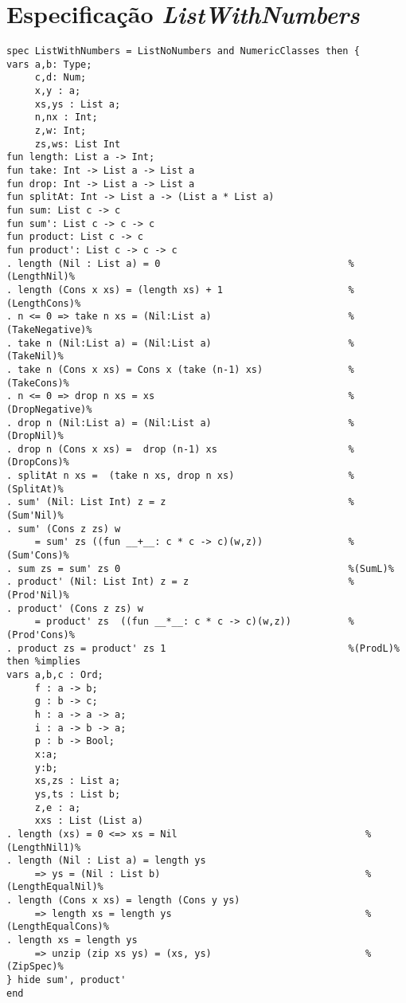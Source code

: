 \section{Especificação \textit{ListWithNumbers}}
\label{appendix:strictSpec:listWithNumbers}
\begin{Verbatim}
spec ListWithNumbers = ListNoNumbers and NumericClasses then {
vars a,b: Type;
     c,d: Num;
     x,y : a;
     xs,ys : List a;
     n,nx : Int;
     z,w: Int;
     zs,ws: List Int
fun length: List a -> Int;
fun take: Int -> List a -> List a
fun drop: Int -> List a -> List a
fun splitAt: Int -> List a -> (List a * List a)
fun sum: List c -> c
fun sum': List c -> c -> c
fun product: List c -> c
fun product': List c -> c -> c
. length (Nil : List a) = 0                                 %(LengthNil)%
. length (Cons x xs) = (length xs) + 1                      %(LengthCons)%
. n <= 0 => take n xs = (Nil:List a)                        %(TakeNegative)%
. take n (Nil:List a) = (Nil:List a)                        %(TakeNil)%
. take n (Cons x xs) = Cons x (take (n-1) xs)               %(TakeCons)%
. n <= 0 => drop n xs = xs                                  %(DropNegative)%
. drop n (Nil:List a) = (Nil:List a)                        %(DropNil)%
. drop n (Cons x xs) =  drop (n-1) xs                       %(DropCons)%
. splitAt n xs =  (take n xs, drop n xs)                    %(SplitAt)%
. sum' (Nil: List Int) z = z                                %(Sum'Nil)%
. sum' (Cons z zs) w
     = sum' zs ((fun __+__: c * c -> c)(w,z))               %(Sum'Cons)%
. sum zs = sum' zs 0                                        %(SumL)%
. product' (Nil: List Int) z = z                            %(Prod'Nil)%
. product' (Cons z zs) w
     = product' zs  ((fun __*__: c * c -> c)(w,z))          %(Prod'Cons)%
. product zs = product' zs 1                                %(ProdL)%
then %implies
vars a,b,c : Ord;
     f : a -> b;
     g : b -> c;
     h : a -> a -> a;
     i : a -> b -> a;
     p : b -> Bool;
     x:a;
     y:b;
     xs,zs : List a;
     ys,ts : List b;
     z,e : a;
     xxs : List (List a)
. length (xs) = 0 <=> xs = Nil                                 %(LengthNil1)%  
. length (Nil : List a) = length ys
     => ys = (Nil : List b)                                    %(LengthEqualNil)%
. length (Cons x xs) = length (Cons y ys)
     => length xs = length ys                                  %(LengthEqualCons)%
. length xs = length ys
     => unzip (zip xs ys) = (xs, ys)                           %(ZipSpec)%
} hide sum', product'
end
\end{Verbatim}

